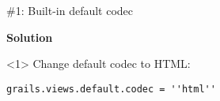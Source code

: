 \begin{frame}

    \vspace{.5cm}

    \begin{center}
      \Huge \#1: Built-in default codec \\
    \end{center}

    \vspace{1cm}

    \Large
    \textbf{Solution} \\[1em]

    \begin{onlyenv}<1>
      Change default codec to HTML:
      \begin{center}
        \begin{minipage}{.9\textwidth}
          \begin{verbatim}
grails.views.default.codec = ''html''
          \end{verbatim}
        \end{minipage}
      \end{center}
    \end{onlyenv}

    \vfill

\end{frame}


